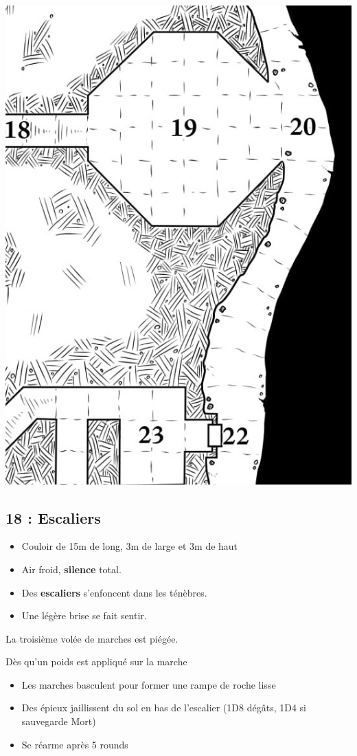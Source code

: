 \newpage
\includegraphics[width=\columnwidth]{pics/map_18-23.jpg}

\subsection{18 : Escaliers}\label{n2:s18}
\begin{itemize}
  \item Couloir de 15m de long, 3m de large et 3m de haut
  \item Air froid, \textbf{silence} total.
  \item Des \textbf{escaliers} s’enfoncent dans les ténèbres.
  \item Une légère brise se fait sentir.
\end{itemize}

La troisième volée de marches est piégée.

\begin{highlight}[Piège]
Dès qu’un poids est appliqué sur la marche
\begin{itemize}
    \item Les marches basculent pour former une rampe de roche lisse
    \item Des épieux jaillissent du sol en bas de l’escalier (1D8 dégâts, 1D4 si sauvegarde Mort)
    \item Se réarme après 5 rounds
\end{itemize}
\end{highlight}

